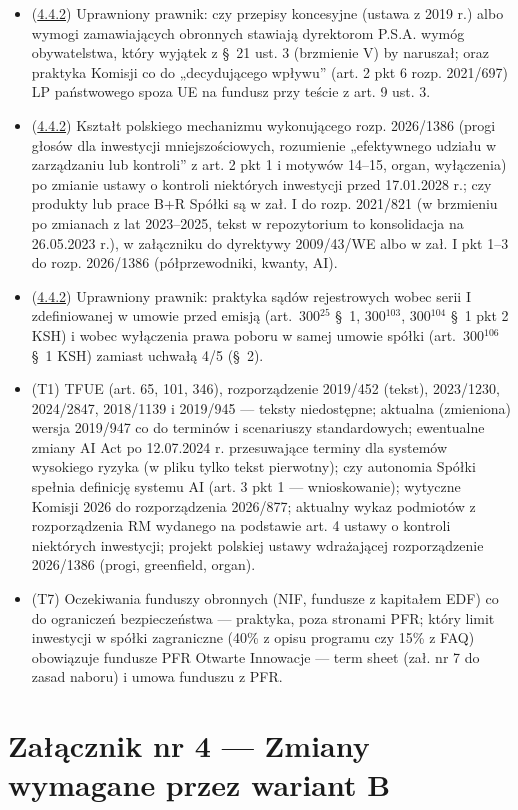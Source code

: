 \documentclass[12pt,a4paper]{report}
\begin{document}
\begin{itemize}
  \item (\hyperref[memo:4.4.2]{4.4.2}) Uprawniony prawnik: czy przepisy koncesyjne (ustawa z 2019 r.) albo wymogi zamawiających obronnych stawiają dyrektorom P.S.A. wymóg obywatelstwa, który wyjątek z §~21 ust. 3 (brzmienie V) by naruszał; oraz praktyka Komisji co do „decydującego wpływu” (art. 2 pkt 6 rozp. 2021/697) LP państwowego spoza UE na fundusz przy teście z art. 9 ust. 3.
  \item (\hyperref[memo:4.4.2]{4.4.2}) Kształt polskiego mechanizmu wykonującego rozp. 2026/1386 (progi głosów dla inwestycji mniejszościowych, rozumienie „efektywnego udziału w zarządzaniu lub kontroli” z art. 2 pkt 1 i motywów 14–15, organ, wyłączenia) po zmianie ustawy o kontroli niektórych inwestycji przed 17.01.2028 r.; czy produkty lub prace B+R Spółki są w zał. I do rozp. 2021/821 (w brzmieniu po zmianach z lat 2023–2025, tekst w repozytorium to konsolidacja na 26.05.2023 r.), w załączniku do dyrektywy 2009/43/WE albo w zał. I pkt 1–3 do rozp. 2026/1386 (półprzewodniki, kwanty, AI).
  \item (\hyperref[memo:4.4.2]{4.4.2}) Uprawniony prawnik: praktyka sądów rejestrowych wobec serii I zdefiniowanej w umowie przed emisją (art.~300$^{25}$ §~1, 300$^{103}$, 300$^{104}$ §~1 pkt 2 KSH) i wobec wyłączenia prawa poboru w samej umowie spółki (art.~300$^{106}$ §~1 KSH) zamiast uchwałą 4/5 (§~2).
  \item (T1) TFUE (art. 65, 101, 346), rozporządzenie 2019/452 (tekst), 2023/1230, 2024/2847, 2018/1139 i 2019/945 — teksty niedostępne; aktualna (zmieniona) wersja 2019/947 co do terminów i scenariuszy standardowych; ewentualne zmiany AI Act po 12.07.2024 r. przesuwające terminy dla systemów wysokiego ryzyka (w pliku tylko tekst pierwotny); czy autonomia Spółki spełnia definicję systemu AI (art. 3 pkt 1 — wnioskowanie); wytyczne Komisji 2026 do rozporządzenia 2026/877; aktualny wykaz podmiotów z rozporządzenia RM wydanego na podstawie art. 4 ustawy o kontroli niektórych inwestycji; projekt polskiej ustawy wdrażającej rozporządzenie 2026/1386 (progi, greenfield, organ).
  \item (T7) Oczekiwania funduszy obronnych (NIF, fundusze z kapitałem EDF) co do ograniczeń bezpieczeństwa — praktyka, poza stronami PFR; który limit inwestycji w spółki zagraniczne (40\% z opisu programu czy 15\% z FAQ) obowiązuje fundusze PFR Otwarte Innowacje — term sheet (zał. nr 7 do zasad naboru) i umowa funduszu z PFR.
\end{itemize}

\section*{Załącznik nr 4 --- Zmiany wymagane przez wariant B}
\end{document}
